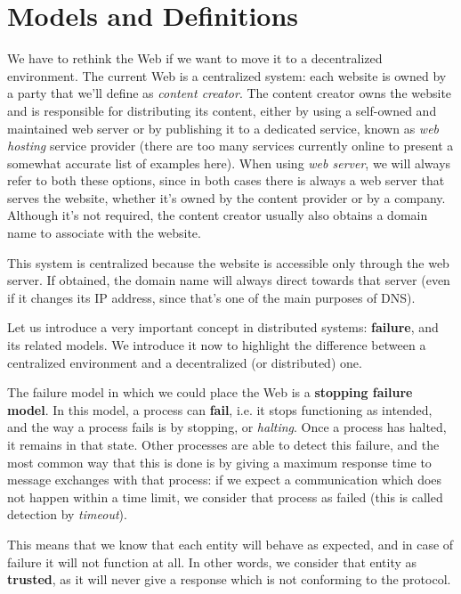 \documentclass[mscthesis]{usiinfthesis}
\begin{document}
\chapter{Models and Definitions}
\label{ch:background}

We have to rethink the Web if we want to move it to a decentralized environment. The current Web is a centralized system: each website is owned by a party that we'll define as \textit{content creator}. The content creator owns the website and is responsible for distributing its content, either by using a self-owned and maintained web server or by publishing it to a dedicated service, known as \textit{web hosting} service provider (there are too many services currently online to present a somewhat accurate list of examples here). When using \textit{web server}, we will always refer to both these options, since in both cases there is always a web server that serves the website, whether it's owned by the content provider or by a company.
Although it's not required, the content creator usually also obtains a domain name to associate with the website.

This system is centralized because the website is accessible only through the web server. If obtained, the domain name will always direct towards that server (even if it changes its IP address, since that's one of the main purposes of DNS).

Let us introduce a very important concept in distributed systems: \textbf{failure}, and its related models.
We introduce it now to highlight the difference between a centralized environment and a decentralized (or distributed) one.

The failure model in which we could place the Web is a \textbf{stopping failure model}.
In this model, a process can \textbf{fail}, i.e. it stops functioning as intended, and the way a process fails is by stopping, or \textit{halting}. Once a process has halted, it remains in that state. Other processes are able to detect this failure, and the most common way that this is done is by giving a maximum response time to message exchanges with that process: if we expect a communication which does not happen within a time limit, we consider that process as failed (this is called detection by \textit{timeout}).

This means that we know that each entity will behave as expected, and in case of failure it will not function at all. In other words, we consider that entity as \textbf{trusted}, as it will never give a response which is not conforming to the protocol.
\end{document}
